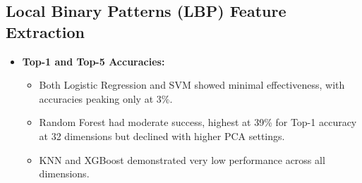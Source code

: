 \documentclass[a4paper]{article}
\theoremstyle{plain}
\theoremstyle{definition}
\begin{document}
\subsection{Local Binary Patterns (LBP) Feature Extraction}
\begin{itemize}
    \item \textbf{Top-1 and Top-5 Accuracies:}
    \begin{itemize}
        \item Both Logistic Regression and SVM showed minimal effectiveness, with accuracies peaking only at 3\%.
        \item Random Forest had moderate success, highest at 39\% for Top-1 accuracy at 32 dimensions but declined with higher PCA settings.
        \item KNN and XGBoost demonstrated very low performance across all dimensions.
    \end{itemize}
\end{itemize}
\end{document}
